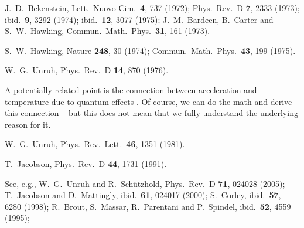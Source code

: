 \documentclass[aps,prl,showpacs,amssymb,nofootinbib,twocolumn]{revtex4}
\begin{document}
\begin{thebibliography}{499}

J.~D.~Bekenstein,
Lett.\ Nuovo Cim.\ {\bf 4}, 737 (1972);
Phys.\ Rev.\ D {\bf 7}, 2333 (1973);
ibid.\ {\bf 9}, 3292 (1974);
ibid.\ {\bf 12}, 3077 (1975);
%
J.~M.~Bardeen, B.~Carter and S.~W.~Hawking,
Commun.\ Math.\ Phys.\ {\bf 31}, 161 (1973).

S.~W.~Hawking,
Nature {\bf 248}, 30 (1974);
Commun.\ Math.\ Phys.\ {\bf 43}, 199 (1975).

W.~G.~Unruh,
Phys.\ Rev.\ D {\bf 14}, 870 (1976).

A potentially related point is the connection between acceleration and  
temperature due to quantum effects \cite{unruh}.
%
Of course, we can do the math and derive this connection -- but this
does not mean that we fully understand the underlying reason for it. 

W.~G.~Unruh,
Phys.\ Rev.\ Lett.\ {\bf 46}, 1351 (1981).

T.~Jacobson,
Phys.\ Rev.\ D {\bf 44}, 1731 (1991).
%
%

See, e.g.,
W.~G.~Unruh and R.~Sch\"utzhold,
Phys.\ Rev.\ D {\bf 71}, 024028 (2005);
%
T.~Jacobson and D.~Mattingly,
ibid.\ {\bf 61}, 024017 (2000);
%
S.~Corley,
ibid.\ {\bf 57}, 6280 (1998);
%
R.~Brout, S.~Massar, R.~Parentani and P.~Spindel,
ibid.\ {\bf 52}, 4559 (1995);


\end{thebibliography}
\end{document}
